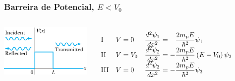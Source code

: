 \documentclass[12pt,brazil,table]{beamer}
\begin{document}
  



\begin{frame}
  \frametitle{Barreira de Potencial, $E<V_0$}
  
  \fontsize{8pt}{11pt}\selectfont
  
  \vspace*{-1.cm}
    \begin{minipage}[t][20ex][t]{\linewidth}
  
      \begin{columns}
          \begin{center}
            \includegraphics[height=2.5cm]{figuras/fig34}
          \end{center}
        
        \[
        \begin{array}[1.2]{lll}
          \text{I} & V=0 & \dfrac{d^2\psi_1}{dx^2}=-\dfrac{2m_pE}{\hbar^2}\psi_1\\
          \text{II} & V=V_0 & \dfrac{d^2\psi_2}{dx^2}=-\dfrac{2m_pE}{\hbar^2}\left(E-V_0\right)\psi_2\\
          \text{III} & V=0 & \dfrac{d^2\psi_3}{dx^2}=-\dfrac{2m_pE}{\hbar^2}\psi_3
        \end{array}
          \]
        
        \end{columns}
    \end{minipage}
   
%   
    \begin{minipage}[b][20ex][t]{\linewidth}
  \vspace*{-0.5cm}
      \begin{columns}


\end{columns}
\end{minipage}
\end{frame}
\end{document}
